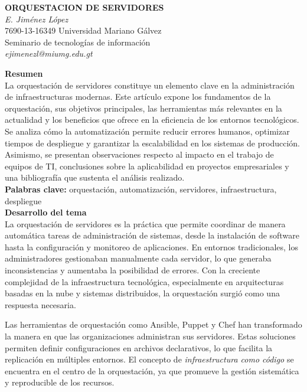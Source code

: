 \documentclass[12pt,letterpaper]{article}
\begin{document}

\begin{center}
\textbf{ORQUESTACION DE SERVIDORES} \\
\textit{E. Jiménez López} \\
7690-13-16349 Universidad Mariano Gálvez \\
Seminario de tecnologías de información \\
\textit{ejimenezl@miumg.edu.gt} \\
\end{center}

\textbf{Resumen} \\
La orquestación de servidores constituye un elemento clave en la administración de infraestructuras modernas. Este artículo expone los fundamentos de la orquestación, sus objetivos principales, las herramientas más relevantes en la actualidad y los beneficios que ofrece en la eficiencia de los entornos tecnológicos. Se analiza cómo la automatización permite reducir errores humanos, optimizar tiempos de despliegue y garantizar la escalabilidad en los sistemas de producción. Asimismo, se presentan observaciones respecto al impacto en el trabajo de equipos de TI, conclusiones sobre la aplicabilidad en proyectos empresariales y una bibliografía que sustenta el análisis realizado. \\

\textbf{Palabras clave:} orquestación, automatización, servidores, infraestructura, despliegue \\

\textbf{Desarrollo del tema} \\
La orquestación de servidores es la práctica que permite coordinar de manera automática tareas de administración de sistemas, desde la instalación de software hasta la configuración y monitoreo de aplicaciones. En entornos tradicionales, los administradores gestionaban manualmente cada servidor, lo que generaba inconsistencias y aumentaba la posibilidad de errores. Con la creciente complejidad de la infraestructura tecnológica, especialmente en arquitecturas basadas en la nube y sistemas distribuidos, la orquestación surgió como una respuesta necesaria. 

Las herramientas de orquestación como Ansible, Puppet y Chef han transformado la manera en que las organizaciones administran sus servidores. Estas soluciones permiten definir configuraciones en archivos declarativos, lo que facilita la replicación en múltiples entornos. El concepto de \textit{infraestructura como código} se encuentra en el centro de la orquestación, ya que promueve la gestión sistemática y reproducible de los recursos. 
\end{document}
